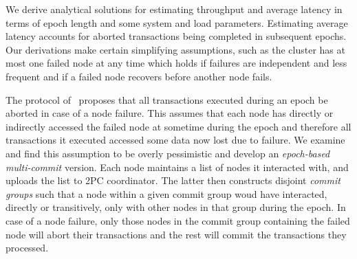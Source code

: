 We derive analytical solutions for estimating throughput and average latency in terms of epoch length and some system and load parameters. Estimating average latency accounts for aborted transactions being completed in subsequent epochs. Our derivations make certain simplifying assumptions, such %
as the cluster has at most one failed node at any time which holds if failures are independent and less frequent and if a failed node recovers before another node fails.   

The protocol of~\cite{lu} proposes that all transactions executed during an epoch be aborted in case of a node failure. This assumes that each node has directly or indirectly accessed the  failed node at sometime during the epoch and therefore all transactions it executed accessed some data now lost due to failure. We examine and find this assumption to be overly pessimistic and develop an \emph{epoch-based multi-commit} version. Each node maintains a list of nodes it interacted with, and uploads the list to 2PC coordinator. The latter then constructs disjoint \emph{commit groups} such that a node within a given commit group woud have interacted, directly or transitively, only with other nodes in that group during the epoch. In case of a node failure, only those nodes in the commit group containing the failed node will abort their transactions and the rest will commit the transactions they processed. 

